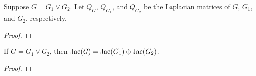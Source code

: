 \begin{lem}
Suppose $G = G_1 \vee G_2$. Let $Q_G$, $Q_{G_1}$, and $Q_{G_2}$ be the Laplacian matrices of $G$, $G_1$, and $G_2$, respectively.
\end{lem}
\begin{proof}

\end{proof}

\begin{prop}
If $G = G_1 \vee G_2$, then $\operatorname{Jac}(G)=\operatorname{Jac}(G_1) \oplus \operatorname{Jac}(G_2)$.
\end{prop}
\begin{proof}

\end{proof}